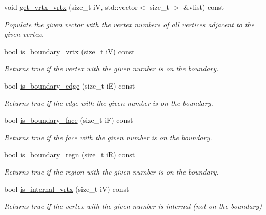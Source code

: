 \begin{DoxyCompactItemize}
void \hyperlink{classStemMesh3D_1_1mesh__3Dv_ae06da20fca1682cf92dd808f2880517f}{get\+\_\+vrtx\+\_\+vrtx} (size\+\_\+t iV, std\+::vector$<$ size\+\_\+t $>$ \&vlist) const
\begin{DoxyCompactList}\small\item\em Populate the given vector with the vertex numbers of all vertices adjacent to the given vertex. \end{DoxyCompactList}\item 
bool \hyperlink{classStemMesh3D_1_1mesh__3Dv_aa6ba589981c83feda412066fd0580032}{is\+\_\+boundary\+\_\+vrtx} (size\+\_\+t iV) const
\begin{DoxyCompactList}\small\item\em Returns true if the vertex with the given number is on the boundary. \end{DoxyCompactList}\item 
bool \hyperlink{classStemMesh3D_1_1mesh__3Dv_ae947ad7de0dffd404d5641467bc5fee4}{is\+\_\+boundary\+\_\+edge} (size\+\_\+t iE) const
\begin{DoxyCompactList}\small\item\em Returns true if the edge with the given number is on the boundary. \end{DoxyCompactList}\item 
bool \hyperlink{classStemMesh3D_1_1mesh__3Dv_a3c02e5034f9c9e08ae91057fb165fbad}{is\+\_\+boundary\+\_\+face} (size\+\_\+t iF) const
\begin{DoxyCompactList}\small\item\em Returns true if the face with the given number is on the boundary. \end{DoxyCompactList}\item 
bool \hyperlink{classStemMesh3D_1_1mesh__3Dv_a3c3a3d3014b5e7d097facf759364f6a7}{is\+\_\+boundary\+\_\+regn} (size\+\_\+t iR) const
\begin{DoxyCompactList}\small\item\em Returns true if the region with the given number is on the boundary. \end{DoxyCompactList}\item 
bool \hyperlink{classStemMesh3D_1_1mesh__3Dv_aa7dc342e2b241b485f5a5f8f722e660f}{is\+\_\+internal\+\_\+vrtx} (size\+\_\+t iV) const
\begin{DoxyCompactList}\small\item\em Returns true if the vertex with the given number is internal (not on the boundary) \end{DoxyCompactList}\item 

\end{DoxyCompactItemize}
